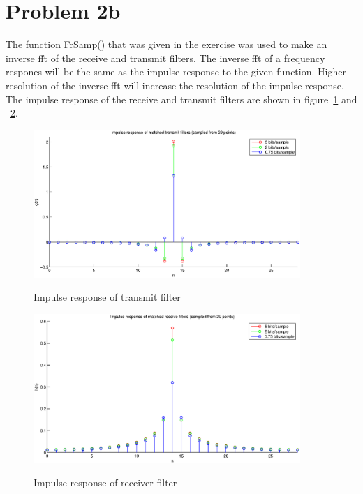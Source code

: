 \section{Problem 2b}
	The function FrSamp() that was given in the exercise was used to make an inverse fft of the receive and transmit filters. The inverse fft of a frequency respones will be the same as the impulse response to the given function. Higher resolution of the inverse fft will increase the resolution of the impulse response. The impulse response of the receive and transmit filters are shown in figure~\ref{fig:impulse_G_diskrete} and ~\ref{fig:impulse_H_diskrete}.
	
	\begin{figure}[h]
	  \centering
	  \includegraphics[width=0.9\textwidth]{img/Oppgave2b_impulse_G_diskrete_t}
	  \label{fig:impulse_G_diskrete}
	  \caption{Impulse response of transmit filter}
	\end{figure}
	
	\begin{figure}[h]
	  \centering
	  \includegraphics[width=0.9\textwidth]{img/Oppgave2b_impulse_H_diskrete_t}
	  \label{fig:impulse_H_diskrete}
	  \caption{Impulse response of receiver filter}
	\end{figure}
	
